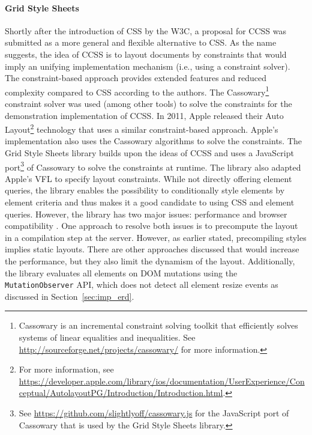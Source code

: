 \documentclass[a4paper,11pt]{kth-mag}
\newcommand{\code}[1]{\texttt{#1}}
\begin{document}
    \paragraph{Grid Style Sheets}
    Shortly after the introduction of \gls{CSS} by the \gls{W3C}, a proposal for \gls{CCSS} was submitted \cite{badros1999constraint} as a more general and flexible alternative to \gls{CSS}.
    As the name suggests, the idea of \gls{CCSS} is to layout \glspl{document} by constraints that would imply an unifying implementation mechanism (i.e., using a constraint solver).
    The constraint-based approach provides extended features and reduced complexity compared to \gls{CSS} according to the authors.
    The Cassowary\footnote{Cassowary is an incremental constraint solving toolkit that efficiently solves systems of linear equalities and inequalities. See \url{http://sourceforge.net/projects/cassowary/} for more information.} constraint solver was used (among other tools) to solve the constraints for the demonstration implementation of \gls{CCSS}.
    In 2011, Apple released their Auto Layout\footnote{For more information, see \url{https://developer.apple.com/library/ios/documentation/UserExperience/Conceptual/AutolayoutPG/Introduction/Introduction.html}.} technology that uses a similar constraint-based approach.
    Apple's implementation also uses the Cassowary algorithms to solve the constraints.
    The Grid Style Sheets library \cite{eq_imp_gss} builds upon the ideas of \gls{CCSS} and uses a \gls{JavaScript} port\footnote{See \url{https://github.com/slightlyoff/cassowary.js} for the \gls{JavaScript} port of Cassowary that is used by the Grid Style Sheets library.} of Cassowary to solve the constraints at runtime.
    The library also adapted Apple's \gls{VFL} to specify layout constraints.
    While not directly offering element queries, the library enables the possibility to conditionally style elements by element criteria and thus makes it a good candidate to using \gls{CSS} and element queries.
    However, the library has two major issues: performance and browser compatibility \cite{gss_issue}.
    One approach to resolve both issues is to precompute the layout in a compilation step at the server.
    However, as earlier stated, precompiling styles implies static layouts.
    There are other approaches discussed that would increase the performance, but they also limit the dynamism of the layout.
    Additionally, the library evaluates all \glspl{element} on \gls{DOM} mutations using the \code{MutationObserver} \gls{API}, which does not detect all element resize events as discussed in Section~\ref{sec:imp_erd}.
\end{document}
